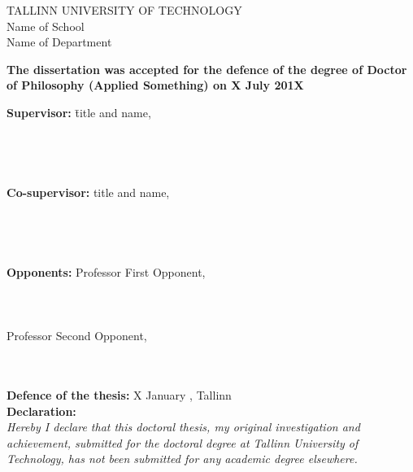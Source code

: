 \thispagestyle{empty} 
{\noindent 
TALLINN UNIVERSITY OF TECHNOLOGY \\
Name of School \\                     %
Name of Department\\                 %
 }

 \noindent
\textbf{The dissertation was accepted for the defence of the degree of Doctor of Philosophy (Applied Something) on X July 201X}\\ %
\vspace{-3mm}

\begin{tabbing}
\textbf{Supervisor:} \quad \quad\= title and name,\\ %
 \\ %
 \\ %
 \\ %
\\
\textbf{Co-supervisor:} 
\> title and name,\\ %
 \\ %
 \\ %
 \\ %
\\
\textbf{Opponents:} 
\> Professor First Opponent, \\ %
 \\ %
 \\ %
\\
\> Professor Second Opponent,\\ %
 \\ %
 \\ %
\end{tabbing}

\noindent
\textbf{Defence of the thesis:} X January \Year, Tallinn \\ %

\noindent
\textbf{Declaration:} \\
\textit{Hereby I declare that this doctoral thesis, my original investigation and achievement, submitted for the doctoral degree at Tallinn University of Technology, has not been submitted for any academic degree elsewhere.}\\

